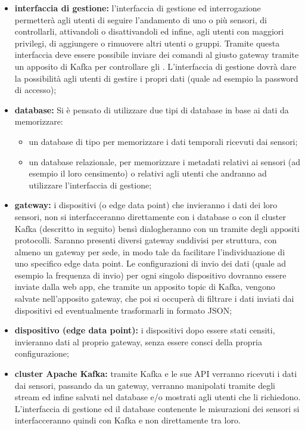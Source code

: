 		\begin{itemize}
			\item \textbf{interfaccia di gestione:} l'interfaccia di gestione ed interrogazione permetterà agli utenti di seguire l'andamento di uno o più sensori, di controllarli, attivandoli o disattivandoli ed infine, agli utenti con maggiori privilegi, di aggiungere o rimuovere altri utenti o gruppi.
			Tramite questa interfaccia deve essere possibile inviare dei comandi al giusto gateway tramite un apposito  di Kafka per controllare gli .
			L'interfaccia di gestione dovrà dare la possibilità agli utenti di gestire i propri dati (quale ad esempio la password di accesso);
			\item \textbf{database:} Si è pensato di utilizzare due tipi di database in base ai dati da memorizzare:
			\begin{itemize}
				\item un database di tipo  per memorizzare i dati temporali ricevuti dai sensori;
				\item un database relazionale, per memorizzare i metadati relativi ai sensori (ad esempio il loro censimento) o relativi agli utenti che andranno ad utilizzare l'interfaccia di gestione;
			\end{itemize}

			\item \textbf{gateway:} i dispositivi (o edge data point) che invieranno i dati dei loro sensori, non si interfacceranno direttamente con i database o con il cluster Kafka (descritto in seguito) bensì dialogheranno con un  tramite degli appositi protocolli.
			Saranno presenti diversi gateway suddivisi per struttura, con almeno un gateway per sede, in modo tale da facilitare l'individuazione di uno specifico edge data point.
			Le configurazioni di invio dei dati (quale ad esempio la frequenza di invio) per ogni singolo dispositivo dovranno essere inviate dalla web app, che tramite un apposito topic di Kafka, vengono salvate nell'apposito gateway, che poi si occuperà di filtrare i dati inviati dai dispositivi ed eventualmente trasformarli in formato JSON;

			\item \textbf{dispositivo (edge data point):} i dispositivi dopo essere stati censiti, invieranno dati al proprio gateway, senza essere consci della propria configurazione;

			\item \textbf{cluster Apache Kafka:} tramite Kafka e le sue API verranno ricevuti i dati dai sensori, passando da un gateway, verranno manipolati tramite degli stream ed infine salvati nel database e/o mostrati agli utenti che li richiedono. L'interfaccia di gestione ed il database contenente le misurazioni dei sensori si interfacceranno quindi con Kafka e non direttamente tra loro.

		\end{itemize}
